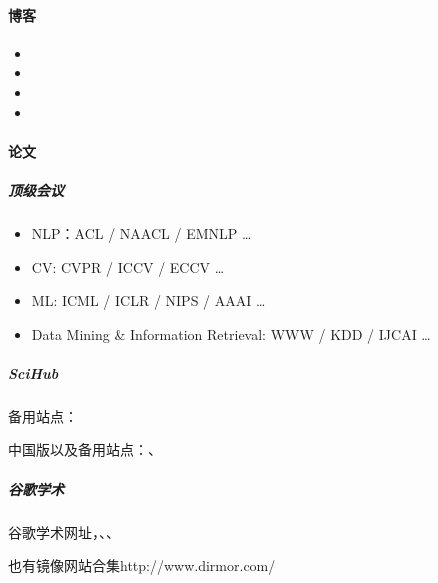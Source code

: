 \documentclass[letterpaper,11pt,english]{sphinxmanual}
\begin{document}
\paragraph{博客}
\label{\detokenize{chapter_skill/research:id2}}\begin{itemize}
\item {} 

\item {} 

\item {} 

\item {} 

\end{itemize}


\paragraph{论文}
\label{\detokenize{chapter_skill/research:id3}}

\subparagraph{顶级会议}
\label{\detokenize{chapter_skill/research:id4}}\begin{itemize}
\item {} 
NLP：ACL / NAACL / EMNLP …

\item {} 
CV: CVPR / ICCV / ECCV …

\item {} 
ML: ICML / ICLR / NIPS / AAAI …

\item {} 
Data Mining \& Information Retrieval: WWW / KDD / IJCAI …

\end{itemize}


\subparagraph{Sci\sphinxhyphen{}Hub}
\label{\detokenize{chapter_skill/research:sci-hub}}

备用站点：

中国版以及备用站点：、


\subparagraph{谷歌学术}
\label{\detokenize{chapter_skill/research:id5}}
谷歌学术网址，、、

也有镜像网站合集http://www.dirmor.com/
\end{document}
